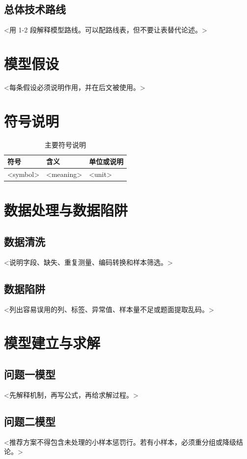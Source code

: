 \documentclass{ctexart}
\begin{document}
\subsection{总体技术路线}
<用 1-2 段解释模型路线。可以配路线表，但不要让表替代论述。>

\section{模型假设}

<每条假设必须说明作用，并在后文被使用。>

\section{符号说明}

\begin{table}[H]
  \centering
  \caption{主要符号说明}
  \begin{tabular}{lll}
    \toprule
    符号 & 含义 & 单位或说明 \\
    \midrule
    <symbol> & <meaning> & <unit> \\
    \bottomrule
  \end{tabular}
\end{table}

\section{数据处理与数据陷阱}

\subsection{数据清洗}
<说明字段、缺失、重复测量、编码转换和样本筛选。>

\subsection{数据陷阱}
<列出容易误用的列、标签、异常值、样本量不足或题面提取乱码。>

\section{模型建立与求解}

\subsection{问题一模型}
<先解释机制，再写公式，再给求解过程。>

\subsection{问题二模型}
<推荐方案不得包含未处理的小样本惩罚行。若有小样本，必须重分组或降级结论。>
\end{document}
